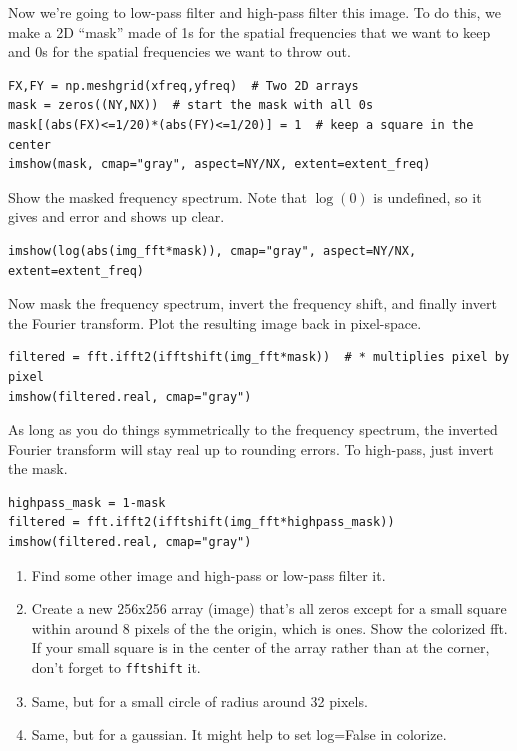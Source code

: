 \documentclass[11pt]{hmcpset}
\begin{document}
\begin{problem}
Now we're going to low-pass filter and high-pass filter this image. To do this, we make a 2D ``mask'' made of 1s for the spatial frequencies that we want to keep and 0s for the spatial frequencies we want to throw out.

\begin{lstlisting}[style=Python]
FX,FY = np.meshgrid(xfreq,yfreq)  # Two 2D arrays
mask = zeros((NY,NX))  # start the mask with all 0s
mask[(abs(FX)<=1/20)*(abs(FY)<=1/20)] = 1  # keep a square in the center
imshow(mask, cmap="gray", aspect=NY/NX, extent=extent_freq)
\end{lstlisting}
Show the masked frequency spectrum.  Note that $\log(0)$ is undefined, so it gives and error and shows up clear.
\begin{lstlisting}[style=Python]
imshow(log(abs(img_fft*mask)), cmap="gray", aspect=NY/NX, extent=extent_freq)
\end{lstlisting}
Now mask the frequency spectrum, invert the frequency shift, and finally invert the Fourier transform. Plot the resulting image back in pixel-space.
\begin{lstlisting}[style=Python]
filtered = fft.ifft2(ifftshift(img_fft*mask))  # * multiplies pixel by pixel
imshow(filtered.real, cmap="gray")
\end{lstlisting}
As long as you do things symmetrically to the frequency spectrum, the inverted Fourier transform will stay real up to rounding errors. To high-pass, just invert the mask.
\begin{lstlisting}[style=Python]
highpass_mask = 1-mask
filtered = fft.ifft2(ifftshift(img_fft*highpass_mask))
imshow(filtered.real, cmap="gray")
\end{lstlisting}

\begin{enumerate}
	\item Find some other image and high-pass or low-pass filter it.
	\item Create a new 256x256 array (image) that's all zeros except for a small square within around 8 pixels of the the origin, which is ones. Show the colorized fft. If your small square is in the center of the array rather than at the corner, don't forget to \texttt{fftshift} it.
	\item Same, but for a small circle of radius around 32 pixels.
	\item Same, but for a gaussian. It might help to set log=False in colorize.
\end{enumerate}





\end{problem}
\pagebreak
\end{document}

